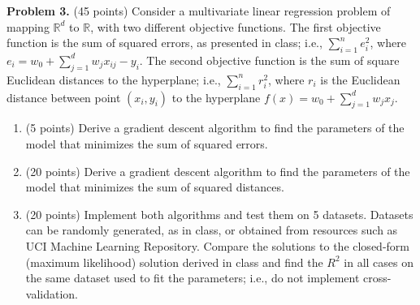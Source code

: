 \documentclass[twoside]{article}
\begin{document}

\textbf{Problem 3.} (45 points) Consider a multivariate linear regression problem of mapping $\mathbb{R}^d$ to $\mathbb{R}$, with two different objective functions. The first objective function is the sum of squared errors, as presented in class; i.e., $\sum_{i=1}^{n}e_{i}^2$, where $e_i=w_0 + \sum_{j=1}^{d}w_jx_{ij} - y_i$. The second objective function is the sum of square Euclidean distances to the hyperplane; i.e., $\sum_{i=1}^{n}r_{i}^2$, where $r_i$ is the Euclidean distance between point $(x_i,y_i)$ to the hyperplane $f(x)=w_0 + \sum_{j=1}^{d}w_jx_j$.

\begin{enumerate}
\item (5 points) Derive a gradient descent algorithm to find the parameters of the model that minimizes the sum of squared errors. 

\item (20 points) Derive a gradient descent algorithm to find the parameters of the model that minimizes the sum of squared distances. 

\item (20 points) Implement both algorithms and test them on 5 datasets. Datasets can be randomly generated, as in class, or obtained from resources such as UCI Machine Learning Repository. Compare the solutions to the closed-form (maximum likelihood) solution derived in class and find the $R^2$ in all cases on the same dataset used to fit the parameters; i.e., do not implement cross-validation.
\end{enumerate}
\end{document}
